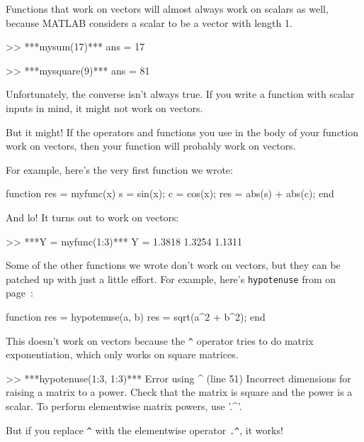 Functions that work on vectors will almost always work on scalars
as well, because MATLAB considers a scalar to be a vector with
length 1.


\begin{code}
>> ***mysum(17)***
ans = 17

>> ***mysquare(9)***
ans = 81
\end{code}

Unfortunately, the converse isn't always true.  If you write
a function with scalar inputs in mind, it might not work on vectors.

But it might!  If the operators and functions
you use in the body of your function work on vectors, then your
function will probably work on vectors.

For example, here's the very first function we wrote:

\begin{code}
function res = myfunc(x)
    s = sin(x);
    c = cos(x);
    res = abs(s) + abs(c);
end
\end{code}

And lo!  It turns out to work on vectors:

\begin{code}
>> ***Y = myfunc(1:3)***
Y = 1.3818    1.3254    1.1311
\end{code}

Some of the other functions we wrote don't work on vectors,
but they can be patched up with just a little effort.  For example,
here's \lstinline{hypotenuse} from  on page~\pageref{hypotenuse_exercise}:

\begin{code}
function res = hypotenuse(a, b)
    res = sqrt(a^2 + b^2);
end
\end{code}

This doesn't work on vectors because the \lstinline{^} operator
tries to do matrix exponentiation, which only works on
square matrices.


\begin{code}
>> ***hypotenuse(1:3, 1:3)***
Error using  ^  (line 51)
Incorrect dimensions for raising a matrix to a power. 
Check that the matrix is square and the power is a scalar. 
To perform elementwise matrix powers, use '.^'.
\end{code}

But if you replace \lstinline{^} with the elementwise operator
\lstinline{.^}, it works!

